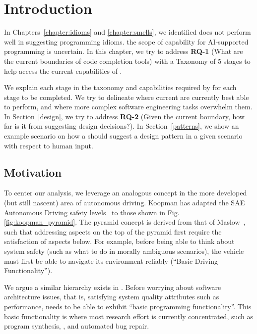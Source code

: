 \label{chapter:framework}

\section{Introduction}
In Chapters~\ref{chapter:idioms} and \ref{chapter:smells}, we identified \cop{} does not perform well in suggesting programming idioms. the scope of capability
for AI-supported programming is uncertain. In this chapter, we try to address \textbf{RQ-1} (What are the current boundaries of code completion tools) with a Taxonomy of 5 stages to help access the current capabilities of \cop{}. 

We explain each stage in the taxonomy and capabilities required by \cct{} for each stage to be completed. We try to delineate where current \cct{} are currently best
able to perform, and where more complex software engineering tasks overwhelm them. 
In Section~\ref{design}, we try to address \textbf{RQ-2} (Given the current boundary, how far is it from suggesting design decisions?). In Section~\ref{patterns}, we show an example scenario on how a \cct{} should suggest a design pattern in a given scenario with respect to human input.

\subsection{Motivation}
To center our analysis, we leverage an analogous concept in the more developed (but still nascent) area of autonomous driving. 
Koopman has adapted the SAE Autonomous Driving safety levels~\cite{sae} to those shown in Fig. \ref{fig:koopman_pyramid}. 
The pyramid concept is derived from that of Maslow~\cite{Maslow1943}, such that addressing aspects on the top of the pyramid first require the satisfaction of aspects below. 
For example, before being able to think about system safety (such as what to do in morally ambiguous scenarios), the vehicle must first be able to navigate its environment reliably (``Basic Driving Functionality'').

We argue a similar hierarchy exists in \AISE{}. Before worrying about software architecture issues, that is, satisfying system quality attributes such as performance, \AISE{} needs to be able to exhibit ``basic programming functionality''. This basic functionality is where most research effort is currently concentrated, such as program synthesis, \cct{}, and automated bug repair.

